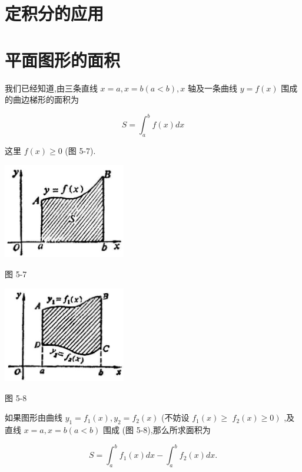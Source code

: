 \documentclass[lang=cn,newtx,10pt,scheme=chinese]{elegantbook}
\begin{document}
\section*{定积分的应用}

\section{平面图形的面积}

我们已经知道,由三条直线 \(x = a,x = b\left( {a < b}\right) ,x\) 轴及一条曲线 \(y = f\left( x\right)\) 围成的曲边梯形的面积为

\[
S = {\int }_{a}^{b}f\left( x\right) {dx}
\]

这里 \(f\left( x\right) \geq 0\) (图 5-7).

\begin{center}
\includegraphics[max width=0.4\textwidth]{images/01912c18-5c3f-733d-b775-749ba9897a9d_232_528761.jpg}
\end{center}

图 5-7

\begin{center}
\includegraphics[max width=0.4\textwidth]{images/01912c18-5c3f-733d-b775-749ba9897a9d_232_995714.jpg}
\end{center}

图 5-8

如果图形由曲线 \({y}_{1} = {f}_{1}\left( x\right) ,{y}_{2} = {f}_{2}\left( x\right)\) (不妨设 \({f}_{1}\left( x\right) \geq\) \(\left. {{f}_{2}\left( x\right) \geq 0}\right)\) ,及直线 \(x = a,x = b\left( {a < b}\right)\) 围成 (图 5-8),那么所求面积为

\[
S = {\int }_{a}^{b}{f}_{1}\left( x\right) {dx} - {\int }_{a}^{b}{f}_{2}\left( x\right) {dx}.
\]
\end{document}

